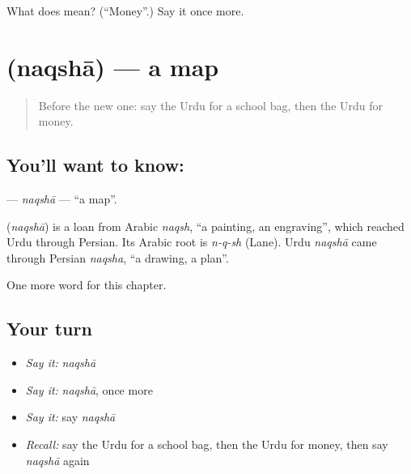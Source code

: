 \begin{tcolorbox}[breakable,colback=teal!4,colframe=teal!35!black,title={Before you move on}]
What does  mean? (\textquotedblleft{}Money\textquotedblright{}.) Say it once more.
\end{tcolorbox}
\section[\texorpdfstring{\ur{نقشہ} (naqshā)}{نقشہ (naqshā)}]{ (naqshā) — a map}

\label{lesson:UR-C62-naqsha}



\begin{quote}
Before the new one: say the Urdu for a school bag, then the Urdu for money.
\end{quote}

\subsection*{You'll want to know: }
\textbf{} — \emph{naqshā} — \textquotedblleft{}a map\textquotedblright{}.

\begin{cousinweb}
\textbf{} (\emph{naqshā}) is a loan from Arabic \emph{naqsh}, \textquotedblleft{}a painting, an engraving\textquotedblright{}, which reached Urdu through Persian. Its Arabic root is \emph{n-q-sh} (Lane). Urdu \emph{naqshā} came through Persian \emph{naqsha}, \textquotedblleft{}a drawing, a plan\textquotedblright{}.
\end{cousinweb}

\begin{grammarlens}[title={What you've built}]
One more word for this chapter.
\end{grammarlens}

\subsection*{Your turn}
\begin{itemize}
\raggedright
  \item \emph{Say it:} \emph{naqshā}
  \item \emph{Say it:} \emph{naqshā}, once more
  \item \emph{Say it:} say \emph{naqshā}
  \item \emph{Recall:} say the Urdu for a school bag, then the Urdu for money, then say \emph{naqshā} again
\end{itemize}


